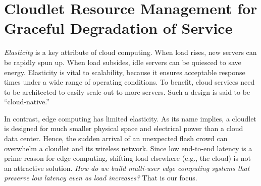 \chapter{Cloudlet Resource Management for Graceful Degradation of Service}
{\em Elasticity} is a key attribute of cloud computing.  When load
rises, new servers can be rapidly spun up.  When load subsides, idle
servers can be quiesced to save energy.  Elasticity is vital to
scalability, because it ensures acceptable response times under a wide
range of operating conditions.  To benefit, cloud services need to be
architected to easily scale out to more servers.  Such a design is
said to be ``cloud-native.''

In contrast, edge computing has limited elasticity.  As its name
implies, a cloudlet is designed for much smaller physical space and
electrical power than a cloud data center.  Hence, the sudden arrival
of an unexpected flash crowd can overwhelm a cloudlet and its wireless
network.  Since low end-to-end latency is a prime reason for edge
computing, shifting load elsewhere (e.g., the cloud) is not an
attractive solution.  {\em How do we build multi-user edge computing
  systems that preserve low latency even as load increases?}  That is
our focus.

